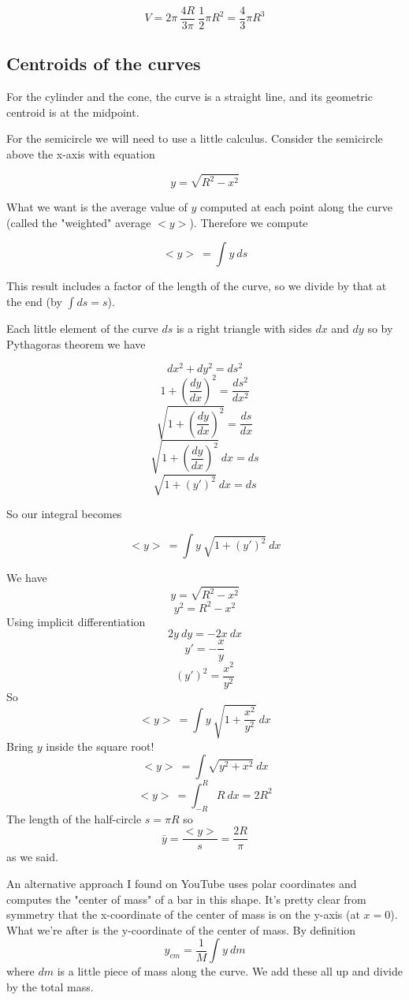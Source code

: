 \documentclass[11pt, oneside]{report}   	%
\begin{document}
\[ V = 2 \pi \ \frac{4 R}{3 \pi} \ \frac{1}{2} \pi R^2 = \frac{4}{3} \pi R^3 \]

\subsection*{Centroids of the curves}
For the cylinder and the cone, the curve is a straight line, and its geometric centroid is at the midpoint.

For the semicircle we will need to use a little calculus.  Consider the semicircle above the x-axis with equation

\[ y = \sqrt{R^2 - x^2} \]

What we want is the average value of $y$ computed at each point along the curve (called the "weighted" average $<y>$).  Therefore we compute

\[ <y> \ = \int y \ ds \]

This result includes a factor of the length of the curve, so we divide by that at the end (by $\int ds = s$).

Each little element of the curve $ds$ is a right triangle with sides $dx$ and $dy$ so by Pythagoras theorem we have

\[ dx^2 + dy^2 = ds^2 \]
\[ 1 + (\frac{dy}{dx})^2 = \frac{ds^2}{dx^2} \]
\[ \sqrt{1 + (\frac{dy}{dx})^2} = \frac{ds}{dx} \]
\[ \sqrt{1 + (\frac{dy}{dx})^2} \ dx = ds \]
\[ \sqrt{1 + (y')^2} \ dx = ds \]

So our integral becomes

\[ <y> \ = \int y \ \sqrt{1 + (y')^2} \ dx \]

We have
\[ y = \sqrt{R^2 - x^2} \]
\[ y^2 = R^2 - x^2 \]
Using implicit differentiation
\[ 2y \ dy = - 2x \ dx \]
\[ y' = -\frac{x}{y} \]
\[ (y')^2 = \frac{x^2}{y^2} \]
So
\[ <y> \ = \int y \ \sqrt{1 + \frac{x^2}{y^2}} \ dx \]
Bring $y$ inside the square root!
\[ <y> \ = \int \sqrt{y^2 + x^2} \ dx \]
\[ <y> \ = \int_{-R}^{R} R \ dx = 2R^2 \]
The length of the half-circle $s=\pi R$ so
\[ \bar{y} = \frac{<y>}{s} = \frac{2R}{\pi} \]
as we said.

An alternative approach I found on YouTube uses polar coordinates and computes the "center of mass" of a bar in this shape.  It's pretty clear from symmetry that the x-coordinate of the center of mass is on the y-axis (at $x=0$).  What we're after is the y-coordinate of the center of mass.  By definition
\[ y_{cm} = \frac{1}{M} \int y \ dm \]
where $dm$ is a little piece of mass along the curve.  We add these all up and divide by the total mass.
\end{document}
